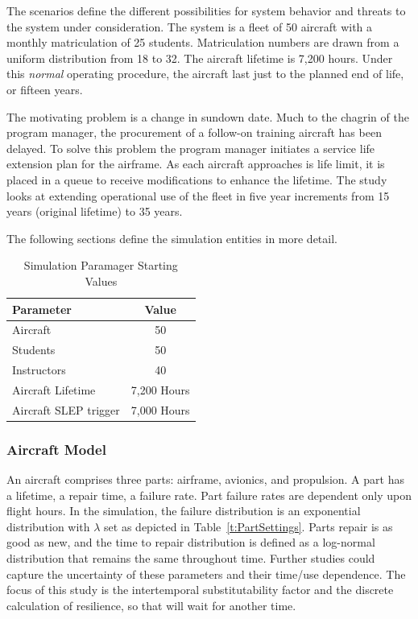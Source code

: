\documentclass[preprint,12pt]{elsarticle}
\begin{document}
The scenarios define the different possibilities for system behavior
and threats to the system under consideration. The system is a fleet
of 50 aircraft with a monthly matriculation of
25 students. Matriculation numbers are drawn from a uniform
distribution from 18 to 32.  The aircraft lifetime is 7,200 hours. Under this
\emph{normal} operating procedure, the  
aircraft last just to the planned end of life, or fifteen years.

The motivating problem is a change in sundown date. Much to the
chagrin of the program manager, the procurement of a follow-on
training aircraft has been delayed. To solve this problem the program manager
initiates a service life extension plan for the airframe. As each
aircraft approaches is life limit, it is placed in a queue to receive
modifications to enhance the lifetime. The study looks at extending
operational use of the fleet in five year increments from 15 years
(original lifetime) to 35 years.

The following sections define the simulation entities in more detail.

\begin{table}[h]
\begin{center}
    \caption{Simulation Paramager Starting Values }
  \label{t:StartingValues}
    \begin{tabular}{l c }
      \hline
      \hline
      \textbf{Parameter} & \textbf{Value} \\
      \hline
      Aircraft & 50 \\
      Students & 50 \\
      Instructors & 40 \\
      Aircraft Lifetime & 7,200 Hours \\
      Aircraft SLEP trigger & 7,000 Hours \\
      \hline
    \end{tabular}
    \end{center}
\end{table}

\subsubsection{Aircraft Model}
An aircraft comprises three parts: airframe, avionics, and
propulsion. A part has a lifetime, a repair time, a failure rate. Part
failure rates are dependent only upon flight hours. In the simulation,
the failure distribution is an exponential distribution with $\lambda$
set as depicted in Table~\ref{t:PartSettings}. Parts repair is
as good as new, and the time to repair distribution is defined as a
log-normal distribution that remains the same throughout time. Further
studies could capture the uncertainty of these parameters and their
time/use dependence. The focus of this study is the intertemporal
substitutability factor and the discrete calculation of resilience, so
that will wait for another time.
\end{document}
